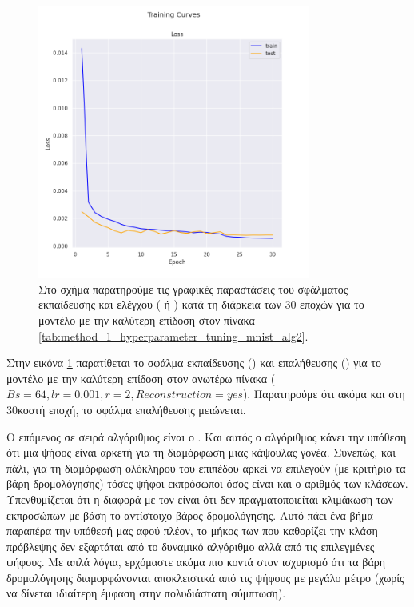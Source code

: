\begin{figure}[h]
    \centering
    \includegraphics[width=0.8\textwidth]{images/chapter experiments/method 1/image 2/train_curve.png}
    \caption{Στο σχήμα παρατηρούμε τις γραφικές παραστάσεις του σφάλματος εκπαίδευσης και ελέγχου ( ή ) κατά τη διάρκεια των 30 εποχών για το μοντέλο με την καλύτερη επίδοση στον πίνακα \ref{tab:method_1_hyperparameter_tuning_mnist_alg2}.}
    \label{fig:exp_method_1_mnist_alg2}
  \end{figure}
Στην εικόνα \ref{fig:exp_method_1_mnist_alg2} παρατίθεται το σφάλμα εκπαίδευσης () και επαλήθευσης () για το μοντέλο με την καλύτερη επίδοση στον ανωτέρω πίνακα ($Bs = 64, lr = 0.001, r = 2, Reconstruction = yes$). Παρατηρούμε ότι ακόμα και στη 30κοστή εποχή, το σφάλμα επαλήθευσης μειώνεται.\par

Ο επόμενος σε σειρά αλγόριθμος είναι ο . Και αυτός ο αλγόριθμος κάνει την υπόθεση ότι μια ψήφος είναι αρκετή για τη διαμόρφωση μιας κάψουλας γονέα. Συνεπώς, και πάλι, για τη διαμόρφωση ολόκληρου του επιπέδου  αρκεί να επιλεγούν (με κριτήριο τα βάρη δρομολόγησης) τόσες ψήφοι εκπρόσωποι όσος είναι και ο αριθμός των κλάσεων. Υπενθυμίζεται ότι η διαφορά με τον  είναι ότι δεν πραγματοποιείται κλιμάκωση των εκπροσώπων με βάση το αντίστοιχο βάρος δρομολόγησης. Αυτό πάει ένα βήμα παραπέρα την υπόθεσή μας αφού πλέον, το μήκος των  που καθορίζει την κλάση πρόβλεψης δεν εξαρτάται από το δυναμικό αλγόριθμο αλλά από τις επιλεγμένες ψήφους. Με απλά λόγια, ερχόμαστε ακόμα πιο κοντά στον ισχυρισμό ότι τα βάρη δρομολόγησης διαμορφώνονται αποκλειστικά από τις ψήφους με μεγάλο μέτρο (χωρίς να δίνεται ιδιαίτερη έμφαση στην πολυδιάστατη σύμπτωση).\par

